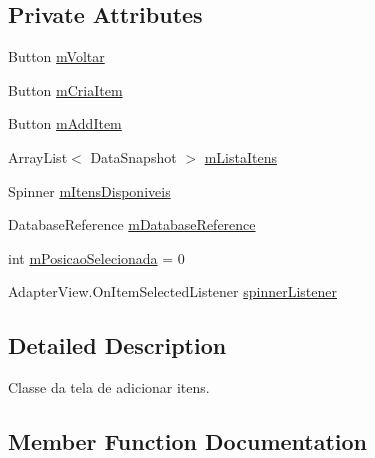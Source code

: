 \subsection*{Private Attributes}
\begin{DoxyCompactItemize}
\item 
Button \mbox{\hyperlink{classbr_1_1unb_1_1cic_1_1mp_1_1marketmaster_1_1AdicionarItensActivity_ad06383e5d68fb110de348fa43b1d2bbb}{m\+Voltar}}
\item 
Button \mbox{\hyperlink{classbr_1_1unb_1_1cic_1_1mp_1_1marketmaster_1_1AdicionarItensActivity_a4813a04e7bf796c7f5e8aa9255d5260d}{m\+Cria\+Item}}
\item 
Button \mbox{\hyperlink{classbr_1_1unb_1_1cic_1_1mp_1_1marketmaster_1_1AdicionarItensActivity_a16ca19324f0ec2a8b0626d329856d2cd}{m\+Add\+Item}}
\item 
Array\+List$<$ Data\+Snapshot $>$ \mbox{\hyperlink{classbr_1_1unb_1_1cic_1_1mp_1_1marketmaster_1_1AdicionarItensActivity_a630a0ca8bd3a11978487176a42e511b4}{m\+Lista\+Itens}}
\item 
Spinner \mbox{\hyperlink{classbr_1_1unb_1_1cic_1_1mp_1_1marketmaster_1_1AdicionarItensActivity_a41e0b8c5a4b34b586e66418f240fe3dc}{m\+Itens\+Disponiveis}}
\item 
Database\+Reference \mbox{\hyperlink{classbr_1_1unb_1_1cic_1_1mp_1_1marketmaster_1_1AdicionarItensActivity_a6b4f9a5b188681139a14f08e51c681be}{m\+Database\+Reference}}
\item 
int \mbox{\hyperlink{classbr_1_1unb_1_1cic_1_1mp_1_1marketmaster_1_1AdicionarItensActivity_a90f04ff7f044bf40edc2ea676bbe1bf8}{m\+Posicao\+Selecionada}} = 0
\item 
Adapter\+View.\+On\+Item\+Selected\+Listener \mbox{\hyperlink{classbr_1_1unb_1_1cic_1_1mp_1_1marketmaster_1_1AdicionarItensActivity_a9de52b12a41e95480a0aabff80e06819}{spinner\+Listener}}
\end{DoxyCompactItemize}


\subsection{Detailed Description}
Classe da tela de adicionar itens. 

\subsection{Member Function Documentation}
\mbox{\label{classbr_1_1unb_1_1cic_1_1mp_1_1marketmaster_1_1AdicionarItensActivity_ad1aeef0f1ffd01b6a39577fcb5d7e6e9}} 
